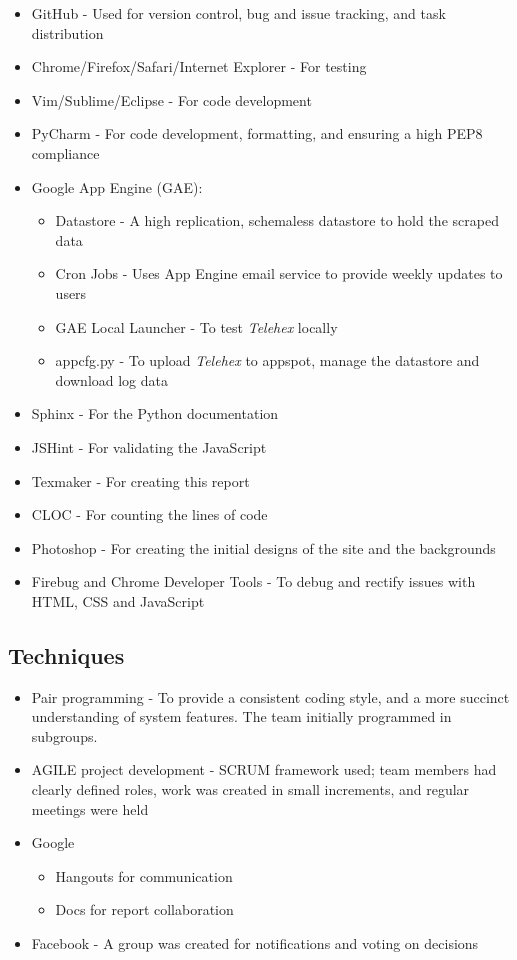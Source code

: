 \documentclass[12pt, a4paper]{article}
\begin{document}
\begin{itemize}
\item GitHub - Used for version control, bug and issue tracking, and task distribution
\item Chrome/Firefox/Safari/Internet Explorer - For testing
\item Vim/Sublime/Eclipse  - For code development
\item PyCharm - For code development, formatting, and ensuring a high PEP8 compliance
\item Google App Engine (GAE):
\begin{itemize}
\item Datastore - A high replication, schemaless datastore to hold the scraped data
\item Cron Jobs - Uses App Engine email service to provide weekly updates to users
\item GAE Local Launcher - To test \textit{Telehex} locally
\item appcfg.py - To upload \textit{Telehex} to appspot, manage the datastore and download log data
\end{itemize}
\item Sphinx - For the Python documentation
\item JSHint - For validating the JavaScript
\item Texmaker - For creating this report
\item CLOC - For counting the lines of code
\item Photoshop - For creating the initial designs of the site and the backgrounds
\item Firebug and Chrome Developer Tools - To debug and rectify issues with HTML, CSS and JavaScript
\end{itemize}


\subsection{Techniques}
\begin{itemize}
\item Pair programming - To provide a consistent coding style, and a more succinct understanding of system features. The team initially programmed in subgroups.
\item AGILE project development - SCRUM framework used; team members had clearly defined roles, work was created in small increments, and regular meetings were held
\item Google
\begin{itemize}
\item Hangouts for communication
\item Docs for report collaboration
\end{itemize}
\item Facebook - A group was created for notifications and voting on decisions
\end{itemize}
\end{document}
